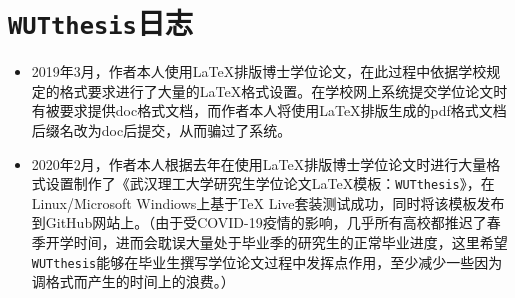 \chapter{\texttt{WUTthesis}日志}



\begin{itemize}
\item 2019年3月，作者本人使用{\LaTeX}排版博士学位论文，在此过程中依据学校规定的格式要求进行了大量的{\LaTeX}格式设置。在学校网上系统提交学位论文时有被要求提供doc格式文档，而作者本人将使用{\LaTeX}排版生成的pdf格式文档后缀名改为doc后提交，从而骗过了系统。
\item 2020年2月，作者本人根据去年在使用{\LaTeX}排版博士学位论文时进行大量格式设置制作了《武汉理工大学研究生学位论文{\LaTeX}模板：\texttt{WUTthesis}》，在Linux/Microsoft Windiows上基于TeX Live套装测试成功，同时将该模板发布到GitHub网站上。（{\color{red}由于受COVID-19疫情的影响，几乎所有高校都推迟了春季开学时间，进而会耽误大量处于毕业季的研究生的正常毕业进度，这里希望\texttt{WUTthesis}能够在毕业生撰写学位论文过程中发挥点作用，至少减少一些因为调格式而产生的时间上的浪费。}）
\end{itemize}






